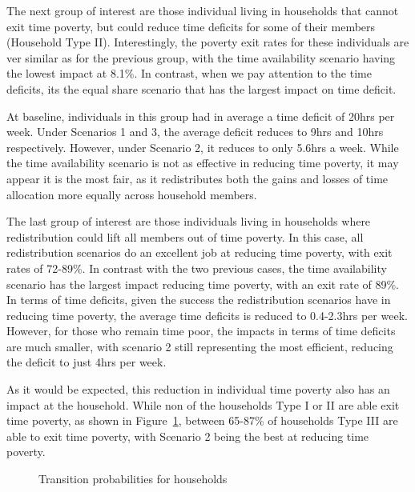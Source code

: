 \documentclass[
  11pt,
]{article}
\begin{document}
The next group of interest are those individual living in households
that cannot exit time poverty, but could reduce time deficits for some
of their members (Household Type II). Interestingly, the poverty exit
rates for these individuals are ver similar as for the previous group,
with the time availability scenario having the lowest impact at 8.1\%.
In contrast, when we pay attention to the time deficits, its the equal
share scenario that has the largest impact on time deficit.

At baseline, individuals in this group had in average a time deficit of
20hrs per week. Under Scenarios 1 and 3, the average deficit reduces to
9hrs and 10hrs respectively. However, under Scenario 2, it reduces to
only 5.6hrs a week. While the time availability scenario is not as
effective in reducing time poverty, it may appear it is the most fair,
as it redistributes both the gains and losses of time allocation more
equally across household members.

The last group of interest are those individuals living in households
where redistribution could lift all members out of time poverty. In this
case, all redistribution scenarios do an excellent job at reducing time
poverty, with exit rates of 72-89\%. In contrast with the two previous
cases, the time availability scenario has the largest impact reducing
time poverty, with an exit rate of 89\%. In terms of time deficits,
given the success the redistribution scenarios have in reducing time
poverty, the average time deficits is reduced to 0.4-2.3hrs per week.
However, for those who remain time poor, the impacts in terms of time
deficits are much smaller, with scenario 2 still representing the most
efficient, reducing the deficit to just 4hrs per week.

As it would be expected, this reduction in individual time poverty also
has an impact at the household. While non of the households Type I or II
are able exit time poverty, as shown in Figure~\ref{fig-transition2},
between 65-87\% of households Type III are able to exit time poverty,
with Scenario 2 being the best at reducing time poverty.

\begin{figure}[H]


\caption{\label{fig-transition2}Transition probabilities for households}

\end{figure}%
\end{document}
